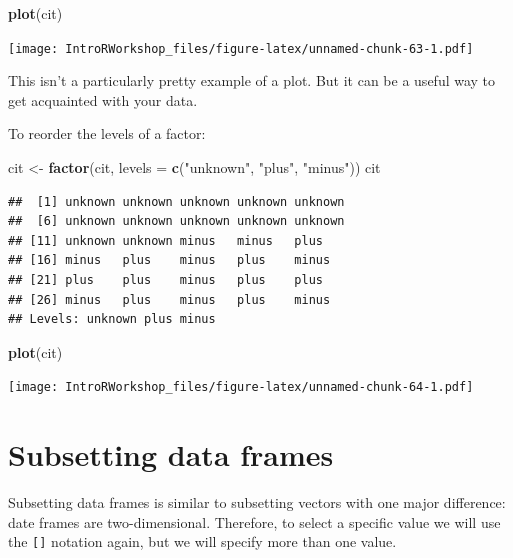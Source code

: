 \documentclass[]{book}
\newenvironment{Shaded}{\begin{snugshade}}{\end{snugshade}}
\newcommand{\DataTypeTok}[1]{\textcolor[rgb]{0.13,0.29,0.53}{#1}}
\newcommand{\KeywordTok}[1]{\textcolor[rgb]{0.13,0.29,0.53}{\textbf{#1}}}
\newcommand{\NormalTok}[1]{#1}
\newcommand{\StringTok}[1]{\textcolor[rgb]{0.31,0.60,0.02}{#1}}
\begin{document}
\begin{Shaded}
\begin{Highlighting}[]
\KeywordTok{plot}\NormalTok{(cit)}
\end{Highlighting}
\end{Shaded}

\texttt{[image: IntroRWorkshop\_files/figure-latex/unnamed-chunk-63-1.pdf]}

This isn't a particularly pretty example of a plot. But it can be a useful way to get acquainted with your data.

To reorder the levels of a factor:

\begin{Shaded}
\begin{Highlighting}[]
\NormalTok{cit <-}\StringTok{ }\KeywordTok{factor}\NormalTok{(cit, }\DataTypeTok{levels =} \KeywordTok{c}\NormalTok{(}\StringTok{"unknown"}\NormalTok{, }\StringTok{"plus"}\NormalTok{, }\StringTok{"minus"}\NormalTok{))}
\NormalTok{cit}
\end{Highlighting}
\end{Shaded}

\begin{verbatim}
##  [1] unknown unknown unknown unknown unknown
##  [6] unknown unknown unknown unknown unknown
## [11] unknown unknown minus   minus   plus   
## [16] minus   plus    minus   plus    minus  
## [21] plus    plus    minus   plus    plus   
## [26] minus   plus    minus   plus    minus  
## Levels: unknown plus minus
\end{verbatim}

\begin{Shaded}
\begin{Highlighting}[]
\KeywordTok{plot}\NormalTok{(cit)}
\end{Highlighting}
\end{Shaded}

\texttt{[image: IntroRWorkshop\_files/figure-latex/unnamed-chunk-64-1.pdf]}

\hypertarget{subsetting-data-frames}{%
\section{Subsetting data frames}\label{subsetting-data-frames}}

Subsetting data frames is similar to subsetting vectors with one major difference: date frames are two-dimensional. Therefore, to select a specific value we will use the \texttt{{[}{]}} notation again, but we will specify more than one value.
\end{document}
